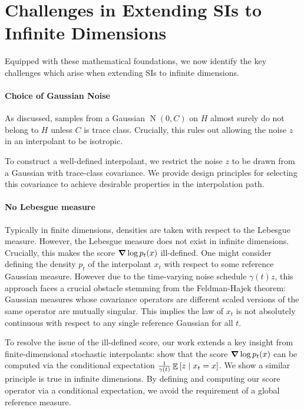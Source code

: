 
\section{Challenges in Extending SIs to Infinite Dimensions}
Equipped with these mathematical foundations, we now identify the key challenges which arise when extending SIs to infinite dimensions.

\paragraph{Choice of Gaussian Noise} As discussed, samples from a Gaussian \(\operatorname{N}(0, C)\) on \(H\) almost surely do not belong to \(H\) unless \(C\) is trace class. Crucially, this rules out allowing the noise \(z\) in an interpolant to be isotropic.

To construct a well-defined interpolant, we restrict the noise \(z\) to be drawn from a Gaussian with trace-class covariance. We provide design principles for selecting this covariance to achieve desirable properties in the interpolation path. %

\paragraph{No Lebesgue measure} Typically in finite dimensions, densities are taken with respect to the Lebesgue measure. However, the Lebesgue measure does not exist in infinite dimensions. Crucially, this makes the score \(\grad \log p_{t}(x)\) ill-defined. One might consider defining the density \(p_{t}\) of the interpolant \(x_{t}\) with respect to some reference Gaussian measure. However due to the time-varying noise schedule \(\gamma(t)z\), this approach faces a crucial obstacle stemming from the Feldman-Hajek theorem: Gaussian measures whose covariance operators are different scaled versions of the same operator are mutually singular. This implies the law of \(x_{t}\) is not absolutely continuous with respect to any single reference Gaussian for all \(t\). %

To resolve the issue of the ill-defined score, our work extends a key insight from finite-dimensional stochastic interpolants: \citet[][Theorem 2.8]{albergo2023stochasticinterpolantsunifyingframework} show that the score \(\grad \log p_{t}(x)\) can be computed via the conditional expectation \(\frac{1}{\gamma(t)} \mathop{\mathbb{E}}\qty[z \mid x_{t} = x]\). We show a similar principle is true in infinite dimensions. By defining and computing our score operator via a conditional expectation, we avoid the requirement of a global reference measure.

